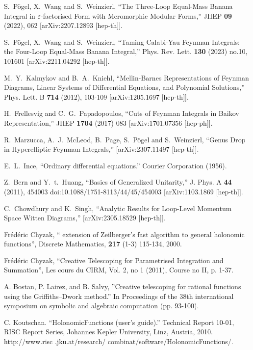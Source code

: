 \documentclass[a4paper,12pt]{article}
\numberwithin{equation}{section}
\numberwithin{figure}{section}
\begin{document}
\begin{thebibliography}{99}
S.~P\"ogel, X.~Wang and S.~Weinzierl,
``The Three-Loop Equal-Mass Banana Integral in \ensuremath{\varepsilon}-factorised Form with Meromorphic Modular Forms,''
JHEP \textbf{09} (2022), 062
[arXiv:2207.12893 [hep-th]].


S.~P\"ogel, X.~Wang and S.~Weinzierl,
``Taming Calabi-Yau Feynman Integrals: the Four-Loop Equal-Mass Banana Integral,''
Phys. Rev. Lett. \textbf{130} (2023) no.10, 101601
[arXiv:2211.04292 [hep-th]].


M.~Y.~Kalmykov and B.~A.~Kniehl,
``Mellin-Barnes Representations of Feynman Diagrams, Linear Systems of Differential Equations, and Polynomial Solutions,''
Phys. Lett. B \textbf{714} (2012), 103-109
[arXiv:1205.1697 [hep-th]].
  
  H.~Frellesvig and C.~G.~Papadopoulos,
  ``Cuts of Feynman Integrals in Baikov Representation,''
  JHEP {\bf 1704} (2017) 083
  [arXiv:1701.07356 [hep-ph]].
  
R.~Marzucca, A.~J.~McLeod, B.~Page, S.~P\"ogel and S.~Weinzierl,
``Genus Drop in Hyperelliptic Feynman Integrals,''
[arXiv:2307.11497 [hep-th]].

 E.~L.~Ince, ``Ordinary differential equations.''
  Courier Corporation  (1956).
 

  
Z.~Bern and Y.~t.~Huang,
``Basics of Generalized Unitarity,''
J. Phys. A \textbf{44} (2011), 454003
doi:10.1088/1751-8113/44/45/454003
[arXiv:1103.1869 [hep-th]].



C.~Chowdhury and K.~Singh,
``Analytic Results for Loop-Level Momentum Space Witten Diagrams,''
[arXiv:2305.18529 [hep-th]].

  Fr\'ed\'eric Chyzak, `` extension of
    Zeilberger's fast algorithm to general holonomic functions'',
Discrete Mathematics, {\bf 217} (1-3) 115-134, 2000.

 Fr\'ed\'eric Chyzak, ``Creative Telescoping for
  Parametrised Integration and Summation'',  Les cours du CIRM,  Vol. 2, no 1 (2011), Course no II, p. 1-37.

 A. Bostan, P. Lairez, and B. Salvy,
  ''Creative telescoping for rational functions using the
  Griffiths--Dwork method.'' In Proceedings of the 38th international
  symposium on symbolic and algebraic computation (pp. 93-100). 


 C. Koutschan. ``HolonomicFunctions (user's guide).'' Technical Report 10-01, RISC Report Series, Johannes Kepler University, Linz, Austria, 2010. http://www.risc
.jku.at/research/ combinat/software/HolonomicFunctions/.
	
	


\end{thebibliography}
\end{document}
